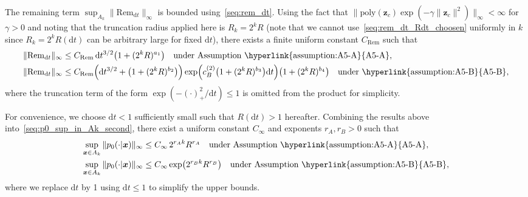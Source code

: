 The remaining term $\sup_{A_k}\|\mathrm{Rem}_{\mathrm dt}\|_\infty$ is bounded using~\eqref{seq:rem_dt}. Using the fact that $\|\text{poly}(\bm z_c)\exp(-\gamma\|\bm z_c\|^2)\|_\infty<\infty$ for $\gamma>0$ and noting that the truncation radius applied here is $R_k=2^kR$ (note that we cannot use~\eqref{seq:rem_dt_Rdt_choosen} uniformly in $k$ since $R_k=2^kR(\mathrm dt)$ can be arbitrary large for fixed $\mathrm dt$), there exists a finite uniform constant $C_{\mathrm{Rem}}$ such that
\begin{subequations}\label{seq:rem_dt_bound_Ak}
\renewcommand{\theequation}{\theparentequation-\Alph{equation}}
\begin{align}
  \|\mathrm{Rem}_{\mathrm dt}\|_\infty&
  \leq C_{\mathrm{Rem}}\,\mathrm dt^{3/2}
  \big(1+(2^kR)^{a_1}\big)
  \quad\text{under Assumption~\hyperlink{assumption:A5-A}{A5-A}}
  \label{seq:rem_dt_A_Ak},
  \\
  \|\mathrm{Rem}_{\mathrm dt}\|_\infty
  &\leq C_{\mathrm{Rem}}
  \Big(\mathrm dt^{3/2}+\big(1+(2^kR)^{b_2}\big)\Big)
  \exp\!\Big(c_B^{(2)}\big(1+(2^kR)^{b_3}\big)\mathrm dt\Big)
  \big(1+(2^kR)^{b_4}\big)
  \quad\text{under~\hyperlink{assumption:A5-B}{A5-B}},
  \label{seq:rem_dt_B_Ak}
\end{align}
\end{subequations}
where the truncation term of the form $\exp(-(\cdot)_+^2/\mathrm dt)\leq1$ is omitted from the product for simplicity.

For convenience, we choose $\mathrm dt<1$ sufficiently small such that $R(\mathrm dt)>1$ hereafter. Combining the results above into~\eqref{seq:p0_sup_in_Ak_second}, there exist a uniform constant $C_\infty$ and exponents $r_A, r_B > 0$ such that
\begin{subequations}\label{seq:p0_sup_in_Ak_simple}
\renewcommand{\theequation}{\theparentequation-\Alph{equation}}
\begin{align}
    \sup_{\bm x\in A_k}
    \|p_0(\cdot|\bm x)\|_\infty
    &\leq
    C_\infty\,2^{r_A k}R^{r_A}
    \quad\text{under Assumption~\hyperlink{assumption:A5-A}{A5-A}}
    \label{seq:p0_sup_in_Ak_simple_A},
    \\
    \sup_{\bm x\in A_k}
    \|p_0(\cdot|\bm x)\|_\infty
    &\leq
    C_\infty\exp\!\big(2^{r_Bk}R^{r_B}\big)
    \quad\text{under Assumption~\hyperlink{assumption:A5-B}{A5-B}},
  \label{seq:p0_sup_in_Ak_simple_B}
\end{align}
\end{subequations}
where we replace $\mathrm dt$ by 1 using $\mathrm dt\leq 1$ to simplify the upper bounds.

